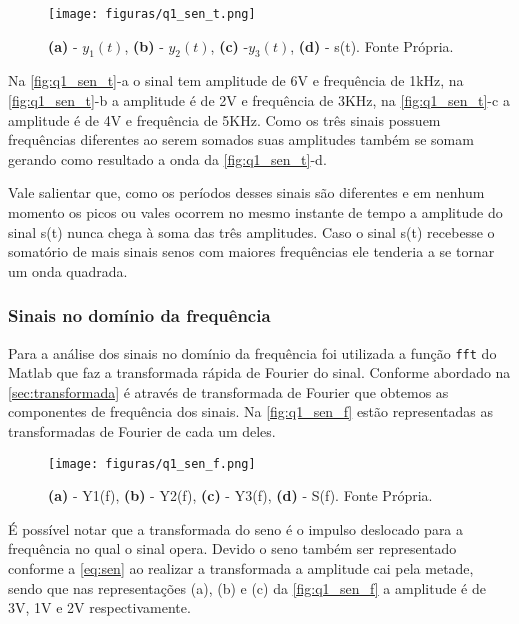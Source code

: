 \documentclass[11pt]{classes/ifscarticle}
\begin{document}
\begin{figure}[ht]
    \centering
    \texttt{[image: figuras/q1\_sen\_t.png]}
    \caption{\textbf{(a)} - $y_1(t)$, \textbf{(b)}  - $y_2(t)$, \textbf{(c)}  -$y_3(t)$, \textbf{(d)} - s(t). Fonte Própria. }
    \label{fig:q1_sen_t}
\end{figure}

 Na \autoref{fig:q1_sen_t}-a o sinal tem amplitude de 6V e frequência de 1kHz, na \autoref{fig:q1_sen_t}-b a amplitude é de 2V e frequência de 3KHz, na \autoref{fig:q1_sen_t}-c a amplitude é de 4V e frequência de 5KHz. Como os três sinais possuem frequências diferentes ao serem somados suas amplitudes também se somam gerando como resultado a onda da \autoref{fig:q1_sen_t}-d. 

Vale salientar que, como os períodos desses sinais são diferentes e em nenhum momento os picos ou vales ocorrem no mesmo instante de tempo a amplitude do sinal s(t) nunca chega à soma das três amplitudes.
Caso o sinal s(t) recebesse o somatório de mais sinais senos com maiores frequências ele tenderia a se tornar um onda quadrada.

\subsubsection{Sinais no domínio da frequência}

Para a análise dos sinais no domínio da frequência foi utilizada a função \texttt{fft} do Matlab que faz a transformada rápida de Fourier do sinal. Conforme abordado na \autoref{sec:transformada} é através de transformada de Fourier que obtemos as componentes de frequência dos sinais.
Na \autoref{fig:q1_sen_f} estão representadas as transformadas de Fourier de cada um deles.

\begin{figure}[ht]
    \centering
    \texttt{[image: figuras/q1\_sen\_f.png]}
    \caption{\textbf{(a)} - Y1(f), \textbf{(b)}  - Y2(f), \textbf{(c)}  - Y3(f), \textbf{(d)} - S(f). Fonte Própria. }
    \label{fig:q1_sen_f}
\end{figure}

 É possível notar que a transformada do seno é o impulso deslocado para a frequência no qual o sinal opera. Devido o seno também ser representado conforme a \autoref{eq:sen} ao realizar a transformada a amplitude cai pela metade, sendo que nas representações (a), (b) e (c) da \autoref{fig:q1_sen_f} a amplitude é de 3V, 1V e 2V respectivamente.
 
\end{document}
